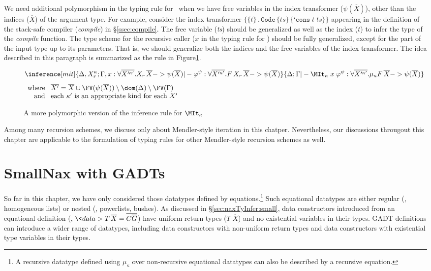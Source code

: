 We need additional polymorphism in the typing rule for \MIt\ when we have free
variables in the index transformer ($\psi(\overline{X})$), other than
the indices ($\overline{X}$) of the argument type. For example, consider
the index transformer $\{\{t\}\,.\,
   \texttt{Code}\,\{\textit{ts}\}\,\{\texttt{`cons}\;t\;\textit{ts}\}\}$
appearing in the definition of the stack-safe compiler (\textit{compile})
in \S\ref{ssec:compile}. The free variable (\textit{ts}) should be generalized
as well as the index ($t$) to infer the type of the \textit{compile} function.
The type scheme for the recursive caller ($x$ in the typing rule for \MIt)
should be fully generalized, except for the part of the input type
up to its parameters. That is, we should generalize both the indices
and the free variables of the index transformer. The idea described
in this paragraph is summarized as the rule 
in Figure\;\ref{fig:SmallNaxRecGen}.

\begin{figure}
\begin{singlespace}
\centering
\[ \inference[\sc mit]{
	\Delta,X_r^\kappa;
	\Gamma,x:\forall\overline{X'^{\kappa'}}.X_r\,\overline{X} -> \psi(\overline{X})
	|- \varphi^\psi :
	\forall\overline{X'^{\kappa'}}.F\,X_r\,\overline{X} -> \psi(\overline{X})
	}{ \Delta;\Gamma |- \MIt_\kappa\;x\;\varphi^\psi:
	\forall\overline{X'^{\kappa'}}.\mu_\kappa F\,\overline{X} -> \psi(\overline{X}) }
\]
$\begin{array}{rl}
\text{where}\!& \overline{X'} = \overline{X} \cup \FV(\psi(\overline{X}))
				\setminus \dom(\Delta) \setminus \FV(\Gamma) \\
\text{and}\!& \text{each $\kappa'$ is an appropriate kind for each $X'$}
\end{array}$
\end{singlespace}
\caption{A more polymorphic version of the inference rule for $\MIt_\kappa$}
\label{fig:SmallNaxRecGen}
\end{figure}

Among many recursion schemes, we discuss only about Mendler-style iteration
in this chatper. Nevertheless, our discussions througout this chapter
are applicable to the formulation of typing rules for
other Mendler-style recursion schemes as well.

\section{SmallNax with GADTs}
\label{sec:naxTyInfer:gadt}
So far in this chapter, we have only considered those datatypes defined
by equations.\footnote{A recursive datatype defined using $\mu_\kappa$
over non-recursive equational datatypes can also be described by
a recursive equation.} Such equational datatypes are either regular
(\eg, homogeneous lists) or nested (\eg, powerlists, bushes).
As discussed in \S\ref{sec:naxTyInfer:small}, data constructors
introduced from an equational definition
(\ie, $\<data> T\,\overline{X} = \overline{C \overline{G}}$) have
uniform return types ($T\;\overline{X}$) and no existential variables
in their types. GADT definitions can introduce a wider range of datatypes,
including data constructors with non-uniform return types and data constructors
with existential type variables in their types.

